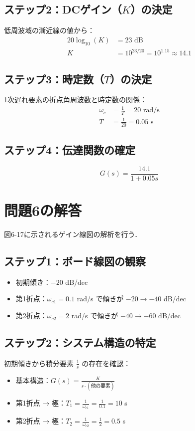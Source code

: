 \documentclass[11pt,a4paper]{ltjsarticle} %
\begin{document}
\subsection{ステップ2：DCゲイン（$K$）の決定}
低周波域の漸近線の値から：
\begin{align}
20\log_{10}(K) &= 23 \text{ dB} \\
K &= 10^{23/20} = 10^{1.15} \approx 14.1
\end{align}

\subsection{ステップ3：時定数（$T$）の決定}
1次遅れ要素の折点角周波数と時定数の関係：
\begin{align}
\omega_c &= \frac{1}{T} = 20 \text{ rad/s} \\
T &= \frac{1}{20} = 0.05 \text{ s}
\end{align}

\subsection{ステップ4：伝達関数の確定}
\begin{equation}
G(s) = \frac{14.1}{1+0.05s}
\end{equation}

\section{問題6の解答}
図6-17に示されるゲイン線図の解析を行う．

\subsection{ステップ1：ボード線図の観察}
\begin{itemize}
\item 初期傾き：$-20$ dB/dec
\item 第1折点：$\omega_{c1} = 0.1$ rad/s で傾きが $-20 \rightarrow -40$ dB/dec
\item 第2折点：$\omega_{c2} = 2$ rad/s で傾きが $-40 \rightarrow -60$ dB/dec
\end{itemize}

\subsection{ステップ2：システム構造の特定}
初期傾きから積分要素 $\frac{1}{s}$ の存在を確認：
\begin{itemize}
\item 基本構造：$G(s) = \frac{K}{s \cdot (\text{他の要素})}$
\item 第1折点 → 極：$T_1 = \frac{1}{\omega_{c1}} = \frac{1}{0.1} = 10$ s
\item 第2折点 → 極：$T_2 = \frac{1}{\omega_{c2}} = \frac{1}{2} = 0.5$ s
\end{itemize}
\end{document}
